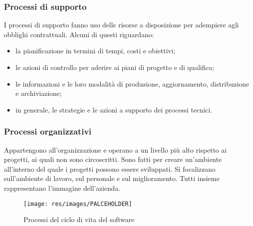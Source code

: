 		\subsubsection{Processi di supporto}
		I processi di supporto fanno uso delle risorse a disposizione per adempiere agli obblighi contrattuali. Alcuni di questi riguardano:
		\begin{itemize}
			\item la pianificazione in termini di tempi, costi e obiettivi;
			\item le azioni di controllo per aderire ai piani di progetto e di qualifica;
			\item le informazioni e le loro modalità di produzione, aggiornamento, distribuzione e archiviazione;
			\item in generale, le strategie e le azioni a supporto dei processi tecnici.
		\end{itemize}
		
		
		\subsubsection{Processi organizzativi}
		Appartengono all'organizzazione e operano a un livello più alto rispetto ai progetti, ai quali non sono circoscritti. Sono fatti per creare un'ambiente all'interno del quale i progetti possono essere sviluppati. Si focalizzano sull'ambiente di lavoro, sul personale e sul miglioramento. Tutti insieme rappresentano l'immagine dell'azienda.
		
		\begin{figure}
			\centering
				\texttt{[image: res/images/PALCEHOLDER]}
			\caption{Processi del ciclo di vita del software}	
		\end{figure}		
			
	
	\pagebreak
